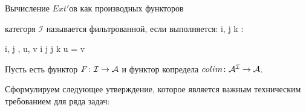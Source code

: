 \documentclass[../hw_main.tex]{subfiles}
\begin{document}
Вычисление $Ext'$ов как производных функторов\\

\begin{to_def}
категоря $\mathcal{I}$ называется фильтрованной, если выполняется:
    \be
            \forall i, j \in {} \quad \exists k : \quad
    \ee
    \be
            \forall i, j \in {}, u, v \colon i \to j \quad \exists \omega \colon j \to k \colon \omega u = \omega v \quad
    \ee
\end{to_def}

Пусть есть функтор $F\colon \mathcal{I}\to \mathcal{A}$ и функтор копредела $colim \colon \mathcal{A}^{\mathcal{I}}\to \mathcal{A}$.

Сформулируем следующее утверждение, которое является важным техническим требованием для ряда задач:\\
\end{document}
